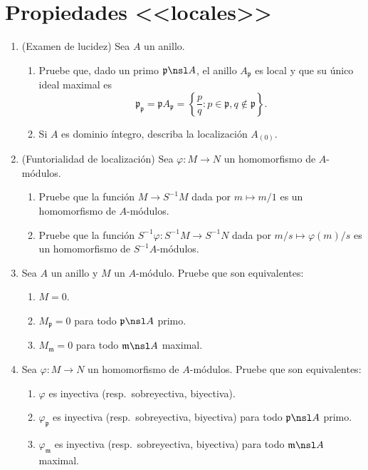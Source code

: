 \documentclass[11pt, reqno]{amsart}
\begin{document}
\section{Propiedades <<locales>>}
\begin{enumerate}
	\item\lookright
		(Examen de lucidez)
		Sea $A$ un anillo.
		\begin{enumerate}
			\item Pruebe que, dado un primo $\mathfrak{p} \nsl A$, el anillo $A_{\mathfrak{p}}$ es local y
				que su único ideal maximal es
				\[
					\mathfrak{p_p} = \mathfrak{p}A_{\mathfrak{p}} =
					\left\{ \frac{p}{q} : p \in \mathfrak{p}, q \notin \mathfrak{p} \right\}.
				\]
			\item Si $A$ es dominio íntegro, describa la localización $A_{(0)}$.
		\end{enumerate}

	\item (Funtorialidad de localización)
		Sea $\varphi \colon M \to N$ un homomorfismo de $A$-módulos.
		\begin{enumerate}
			\item Pruebe que la función $M \to S^{-1}M$ dada por $m \mapsto m/1$ es un homomorfismo de
				$A$-módulos.
			\item Pruebe que la función $S^{-1}\varphi \colon S^{-1}M \to S^{-1}N$ dada por $m/s \mapsto
				\varphi(m)/s$ es un homomorfismo de $S^{-1}A$-módulos.
		\end{enumerate}

	\item Sea $A$ un anillo y $M$ un $A$-módulo.
		Pruebe que son equivalentes:
		\begin{enumerate}
			\item $M = 0$.
			\item $M_{\mathfrak{p}} = 0$ para todo $\mathfrak{p} \nsl A$ primo.
			\item $M_{\mathfrak{m}} = 0$ para todo $\mathfrak{m} \nsl A$ maximal.
		\end{enumerate}

	\item Sea $\varphi \colon M \to N$ un homomorfismo de $A$-módulos.
		Pruebe que son equivalentes:
		\begin{enumerate}
			\item $\varphi$ es inyectiva (resp.\ sobreyectiva, biyectiva).
			\item $\varphi_{\mathfrak{p}}$ es inyectiva (resp.\ sobreyectiva, biyectiva) para todo
				$\mathfrak{p} \nsl A$ primo.
			\item $\varphi_{\mathfrak{m}}$ es inyectiva (resp.\ sobreyectiva, biyectiva) para todo
				$\mathfrak{m} \nsl A$ maximal.
		\end{enumerate}


\end{enumerate}
\end{document}
